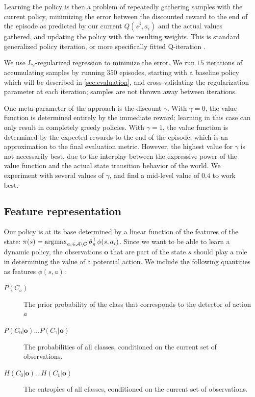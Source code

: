 Learning the policy is then a problem of repeatedly gathering samples with the current policy, minimizing the error between the discounted reward to the end of the episode as predicted by our current $Q(s^j,a_i)$ and the actual values gathered, and updating the policy with the resulting weights.
This is standard generalized policy iteration, or more specifically fitted Q-iteration \cite{Sutton1998,Ernst2005}.

We use $L_2$-regularized regression to minimize the error.
We run $15$ iterations of accumulating samples by running $350$ episodes, starting with a baseline policy which will be described in \autoref{sec:evaluation}, and cross-validating the regularization parameter at each iteration; samples are not thrown away between iterations.

One meta-parameter of the approach is the discount $\gamma$.
With $\gamma=0$, the value function is determined entirely by the immediate reward; learning in this case can only result in completely greedy policies.
With $\gamma=1$, the value function is determined by the expected rewards to the end of the episode, which is an approximation to the final evaluation metric.
However, the highest value for $\gamma$ is not necessarily best, due to the interplay between the expressive power of the value function and the actual state transition behavior of the world.
We experiment with several values of $\gamma$, and find a mid-level value of $0.4$ to work best.

\subsection{Feature representation}
Our policy is at its base determined by a linear function of the features of the state: $\pi(s) = \argmax_{a_i \in \mathcal{A} \setminus \mathcal{O}} \theta_\pi^\top \phi(s,a_i)$.
Since we want to be able to learn a dynamic policy, the observations $\mathbf{o}$ that are part of the state $s$ should play a role in determining the value of a potential action.
We include the following quantities as features $\phi(s,a)$:
\begin{description}
\item[$P(C_a)$] The prior probability of the class that corresponds to the detector of action $a$
\item[$P(C_0|\mathbf{o}) \ldots P(C_1|\mathbf{o})$] The probabilities of all classes, conditioned on the current set of observations.
\item[$H(C_0|\mathbf{o}) \ldots H(C_1|\mathbf{o})$] The entropies of all classes, conditioned on the current set of observations.
\end{description}

